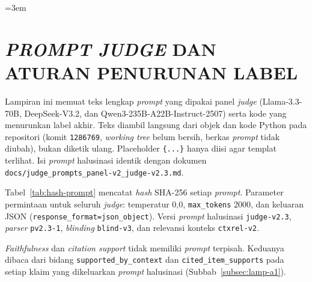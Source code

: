 \emergencystretch=3em

\cleardoublepage
\chapter{\textit{PROMPT JUDGE} DAN ATURAN PENURUNAN LABEL}
\label{lamp:prompt-judge}

Lampiran ini memuat teks lengkap \emph{prompt} yang dipakai panel \emph{judge} (Llama-3.3-70B, DeepSeek-V3.2, dan Qwen3-235B-A22B-Instruct-2507) serta kode yang menurunkan label akhir. Teks diambil langsung dari objek dan kode Python pada repositori (komit \texttt{1286769}, \emph{working tree} belum bersih, berkas \emph{prompt} tidak diubah), bukan diketik ulang. Placeholder \texttt{\{...\}} hanya diisi agar templat terlihat. Isi \emph{prompt} halusinasi identik dengan dokumen \texttt{docs/\allowbreak{}judge\_\allowbreak{}prompts\_\allowbreak{}panel-v2\_\allowbreak{}judge-v2.\allowbreak{}3.\allowbreak{}md}.

Tabel~\ref{tab:hash-prompt} mencatat \emph{hash} SHA-256 setiap \emph{prompt}. Parameter permintaan untuk seluruh \emph{judge}: temperatur 0,0, \texttt{max\_tokens} 2000, dan keluaran JSON (\texttt{response\_\allowbreak{}format=\allowbreak{}json\_\allowbreak{}object}). Versi \emph{prompt} halusinasi \texttt{judge-v2.3}, \emph{parser} \texttt{pv2.3-1}, \emph{blinding} \texttt{blind-v3}, dan relevansi konteks \texttt{ctxrel-v2}.

\emph{Faithfulness} dan \emph{citation support} tidak memiliki \emph{prompt} terpisah. Keduanya dibaca dari bidang \texttt{supported\_\allowbreak{}by\_\allowbreak{}context} dan \texttt{cited\_\allowbreak{}item\_\allowbreak{}supports} pada setiap klaim yang dikeluarkan \emph{prompt} halusinasi (Subbab~\ref{subsec:lamp-a1}).

